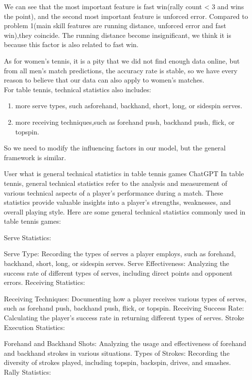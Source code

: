 \documentclass[12pt, a4paper, oneside]{article}
\theoremstyle{break}
\begin{document}
We can see that the most important feature is fast win(rally count < 3 and wins the point),
and the second most important feature is unforced error. Compared to problem 1(main skill features are
running distance, unforced error and fast win),they coincide. The running distance become insignificant, 
we think it is because this factor is also related to fast win.



As for women's tennis, it is a pity that we did not find enough data online, but from all men's match predictions, the 
accuracy rate is stable, so we have every reason to believe that our data can also apply to women's matches. \\
For table tennis, technical statistics also includes: 
\begin{enumerate}
    \item more serve types, such asforehand, backhand, short, long, or sidespin serves.
    \item more receiving techniques,such as forehand push, backhand push, flick, or topspin.
\end{enumerate}
So we need to modify the influencing factors in our model, but the general framework is similar.



User
what is general technical statistics in table tennis games
ChatGPT
In table tennis, general technical statistics refer to the analysis and measurement of various technical aspects of a player's performance during a match. These statistics provide valuable insights into a player's strengths, weaknesses, and overall playing style. Here are some general technical statistics commonly used in table tennis games:

Serve Statistics:

Serve Type: Recording the types of serves a player employs, such as forehand, backhand, short, long, or sidespin serves.
Serve Effectiveness: Analyzing the success rate of different types of serves, including direct points and opponent errors.
Receiving Statistics:

Receiving Techniques: Documenting how a player receives various types of serves, such as forehand push, backhand push, flick, or topspin.
Receiving Success Rate: Calculating the player's success rate in returning different types of serves.
Stroke Execution Statistics:

Forehand and Backhand Shots: Analyzing the usage and effectiveness of forehand and backhand strokes in various situations.
Types of Strokes: Recording the diversity of strokes played, including topspin, backspin, drives, and smashes.
Rally Statistics:
\end{document}

